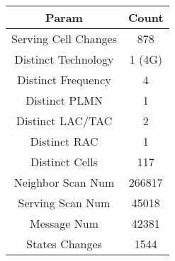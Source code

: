 \begin{longtable*}{|c|c|}\hline
{}
Param&Count\\\hline\hline
{}Serving Cell Changes&878\\\hline
{}Distinct Technology&1 (4G)\\\hline
{}Distinct Frequency&4\\\hline
{}Distinct PLMN&1\\\hline
{}Distinct LAC/TAC&2\\\hline
{}Distinct RAC&1\\\hline
{}Distinct Cells&117\\\hline
{}Neighbor Scan Num&266817\\\hline
{}Serving Scan Num&45018\\\hline
{}Message Num&42381\\\hline
{}States Changes&1544\\\hline
\end{longtable*}
